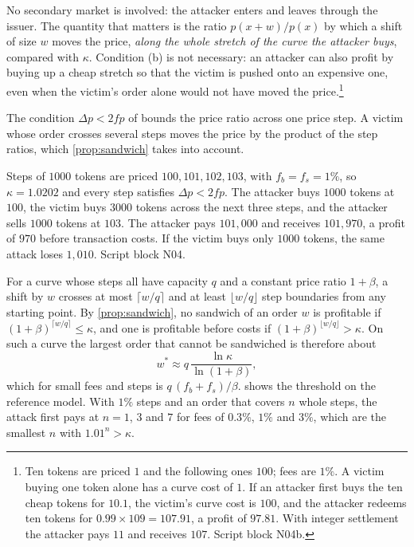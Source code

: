 No secondary market is involved: the attacker enters and leaves through the issuer. The quantity that matters is the ratio $p(x+w)/p(x)$ by which a shift of size $w$ moves the price, \emph{along the whole stretch of the curve the attacker buys}, compared with $\kappa$. Condition (b) is not necessary: an attacker can also profit by buying up a cheap stretch so that the victim is pushed onto an expensive one, even when the victim's order alone would not have moved the price.\footnote{Ten tokens are priced $1$ and the following ones $100$; fees are $1\%$. A victim buying one token alone has a curve cost of $1$. If an attacker first buys the ten cheap tokens for $10.1$, the victim's curve cost is $100$, and the attacker redeems ten tokens for $0.99\times109=107.91$, a profit of $97.81$. With integer settlement the attacker pays $11$ and receives $107$. Script block N04b.}

The condition $\Delta p<2fp$ of \citet{dabc2026} bounds the price ratio across one price step. A victim whose order crosses several steps moves the price by the product of the step ratios, which \cref{prop:sandwich} takes into account.

\begin{example}\label{ex:sandwich}
Steps of $1000$ tokens are priced $100,101,102,103$, with $f_b=f_s=1\%$, so $\kappa=1.0202$ and every step satisfies $\Delta p<2fp$. The attacker buys $1000$ tokens at $100$, the victim buys $3000$ tokens across the next three steps, and the attacker sells $1000$ tokens at $103$. The attacker pays $101{,}000$ and receives $101{,}970$, a profit of $970$ before transaction costs. If the victim buys only $1000$ tokens, the same attack loses $1{,}010$. Script block N04.
\end{example}

For a curve whose steps all have capacity $q$ and a constant price ratio $1+\beta$, a shift by $w$ crosses at most $\lceil w/q\rceil$ and at least $\lfloor w/q\rfloor$ step boundaries from any starting point. By \cref{prop:sandwich}, no sandwich of an order $w$ is profitable if $(1+\beta)^{\lceil w/q\rceil}\le\kappa$, and one is profitable before costs if $(1+\beta)^{\lfloor w/q\rfloor}>\kappa$. On such a curve the largest order that cannot be sandwiched is therefore about
\[
w^\ast\approx q\,\frac{\ln\kappa}{\ln(1+\beta)} ,
\]
which for small fees and steps is $q\,(f_b+f_s)/\beta$.  shows the threshold on the reference model. With $1\%$ steps and an order that covers $n$ whole steps, the attack first pays at $n=1$, $3$ and $7$ for fees of $0.3\%$, $1\%$ and $3\%$, which are the smallest $n$ with $1.01^n>\kappa$.

